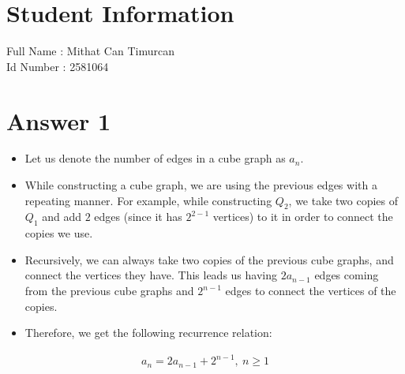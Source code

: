 \documentclass[12pt]{article}
\begin{document}
\section*{Student Information } 
Full Name : Mithat Can Timurcan\\
Id Number :  2581064\\

\section*{Answer 1}
\begin{itemize}
 \item Let us denote the number of edges in a cube graph as $a_n$.
 \item While constructing a cube graph, we are using the previous edges with a repeating manner. For example, while constructing $Q_2$, we take two copies of $Q_1$ and add $2$ edges (since it has $2^{2-1}$ vertices) to it in order to connect the copies we use.
 \item Recursively, we can always take two copies of the previous cube graphs, and connect the vertices they have. This leads us having $2a_{n-1}$ edges coming from the previous cube graphs and $2^{n-1}$ edges to connect the vertices of the copies.
 \item Therefore, we get the following recurrence relation:
\end{itemize}
\begin{equation*}
 \begin{aligned}
  a_n = 2a_{n-1}+2^{n-1}, \ n \geq 1
 \end{aligned}
\end{equation*}
\end{document}
